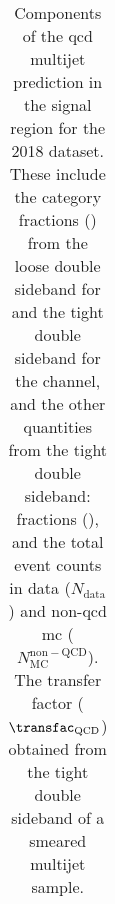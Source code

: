 \begin{table}[htbp]
\begin{tabular*}{\linewidth}{@{\extracolsep{\fill}}llclcccr}
\bottomrule
\end{tabular*}
\caption[Components of the \acrshort{qcd} multijet prediction in the signal region for the 2018 dataset]{Components of the \acrshort{qcd} multijet prediction in the signal region for the 2018 dataset. These include the category fractions (\catFraction) from the loose double sideband for \ttH and the tight double sideband for the \VH channel, and the other quantities from the tight double sideband: \ptmiss fractions (\metFraction), and the total event counts in data ($N_{\mathrm{data}}$) and non-\acrshort{qcd} \acrshort{mc} ($N_{\mathrm{MC}}^{\mathrm{non-QCD}}$). The transfer factor ($\transfac_{\mathrm{QCD}}$) obtained from the tight double sideband of a smeared multijet sample.}
\label{tab:htoinv_qcd_pred_2018}
\end{table}
